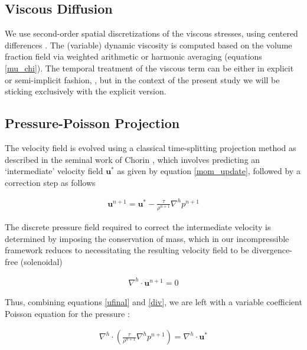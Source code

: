 \subsection*{Viscous Diffusion}
We use second-order spatial discretizations of the viscous stresses, using centered differences
. 
The (variable) dynamic viscosity is computed based on the  
volume fraction field via weighted arithmetic or harmonic averaging (equations \ref{mu_chi}). 
The temporal treatment of the viscous term can be either in explicit or semi-implicit fashion,  
, but in the context of the present study we will be sticking exclusively with the explicit version.     


\subsection*{Pressure-Poisson Projection}

The velocity field is evolved using a classical time-splitting projection method 
as described in the seminal work of Chorin \cite{chorin1969convergence}, 
which involves predicting an `intermediate' velocity field $\boldsymbol{u}^{*}$ 
as given by equation \ref{mom_update}, followed by a correction step as follows        

\begin{align}
\boldsymbol{u}^{n+1} = \boldsymbol{u}^{*} - \frac{\tau}{\rho^{n+1}}\nabla^{h}p^{n+1}
\label{ufinal}
\end{align}

The discrete pressure field required to correct the intermediate velocity 
is determined by imposing the conservation of mass, which in our incompressible 
framework reduces to necessitating the resulting velocity field to be divergence-free (solenoidal)  

\begin{align}
\nabla^{h}\cdot\boldsymbol{u}^{n+1} = 0
\label{div}
\end{align}

Thus, combining equations \ref{ufinal} and \ref{div}, 
we are left with a variable coefficient Poisson equation for the pressure :  

\begin{align}
\nabla^{h}\cdot\left(\frac{\tau}{\rho^{n+1}}\nabla^{h}p^{n+1}\right) = \nabla^{h}\cdot \boldsymbol{u}^{*} 
	\label{poisson}
\end{align}

